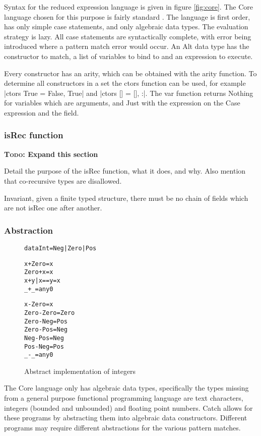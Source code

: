 \documentclass[preprint]{sigplanconf}
\newcommand{\C}[1]{\textsf{#1}}
\newcommand{\todo}[1]{\textbf{\textsc{Todo:} #1}}
\newenvironment{code}{\begin{alltt}\small}{\end{alltt}}
\begin{document}
Syntax for the reduced expression language is given in figure \ref{fig:core}. The Core language chosen for this purpose is fairly standard \cite{spj_lester_book}. The language is first order, has only simple case statements, and only algebraic data types. The evaluation strategy is lazy. All case statements are syntactically complete, with error being introduced where a pattern match error would occur. An \C{Alt} data type has the constructor to match, a list of variables to bind to and an expression to execute.

Every constructor has an arity, which can be obtained with the \C{arity} function. To determine all constructors in a set the \C{ctors} function can be used, for example |ctors True = {False, True}| and |ctors [] = {[], :}|. The \C{var} function returns \C{Nothing} for variables which are arguments, and \C{Just} with the expression on the \C{Case} expression and the field.

\subsubsection{\C{isRec} function}

\todo{Expand this section}

Detail the purpose of the \C{isRec} function, what it does, and why. Also mention that co-recursive types are disallowed.

Invariant, given a finite typed structure, there must be no chain of fields which are not \C{isRec} one after another.

\subsubsection{Abstraction}

\begin{figure}
\begin{code}
data Int = Neg | Zero | Pos

x     + Zero  = x
Zero  + x     = x
x     + y     | x == y = x
_     + _     = any0

x     - Zero  = x
Zero  - Zero  = Zero
Zero  - Neg   = Pos
Zero  - Pos   = Neg
Neg   - Pos   = Neg
Pos   - Neg   = Pos
_     - _     = any0
\end{code}
\caption{Abstract implementation of integers}
\label{fig:abstract_int}
\end{figure}

The Core language only has algebraic data types, specifically the types missing from a general purpose functional programming language are text characters, integers (bounded and unbounded) and floating point numbers. Catch allows for these programs by abstracting them into algebraic data constructors. Different programs may require different abstractions for the various pattern matches.
\end{document}
